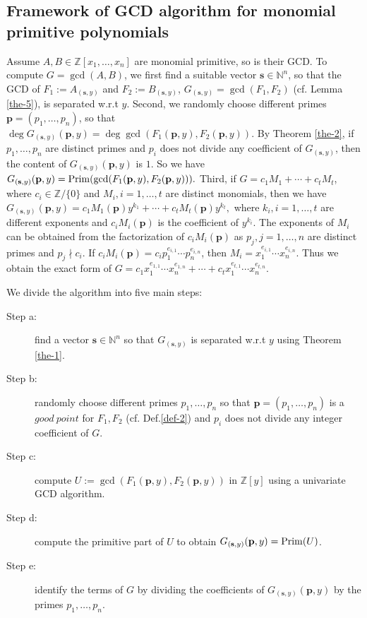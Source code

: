 \documentclass[final,20pt]{elsarticle}
\def\N{{\mathbb N}}
\def\Z{{\mathbb Z}}
\begin{document}
\subsection{Framework of GCD algorithm for monomial primitive polynomials}\label{sec-a3}
Assume $A,B\in \Z[x_1,\dots,x_n]$ are monomial primitive, so is their GCD.
%
To compute $G=\gcd(A,B)$, we first find a suitable vector $\mathbf{s}\in\N^n$, so that  the GCD of $F_1:=A_{(\mathbf{s},y)}$ and $F_2:=B_{(\mathbf{s},y)}$,  $G_{(\mathbf{s},y)}=\gcd(F_1,F_2)$ (cf. Lemma \ref{the-5}), is separated w.r.t $y$.
%
Second, we randomly choose different primes $\mathbf{p}=(p_1,\dots,p_n)$, so that $\deg G_{(\mathbf{s},y)}(\mathbf{p},y)=\deg \gcd(F_1(\mathbf{p},y),F_2(\mathbf{p},y)).$
By Theorem \ref{the-2}, if $p_1,\dots,p_n$ are distinct primes and $p_i$ does not divide any coefficient of $G_{(\mathbf{s},y)}$, then the content of $G_{(\mathbf{s},y)}(\mathbf{p},y)$ is $1$. So we have
$G_{(\mathbf{s},y)}(\mathbf{p},y)={\rm Prim}( \gcd(F_1(\mathbf{p},y),F_2(\mathbf{p},y))).$
%
Third, if $G=c_1M_1+\cdots+c_tM_t$, where $c_i\in\Z/\{0\}$ and $M_i,i=1,\dots,t$ are distinct monomials, then we have
$G_{(\mathbf{s},y)}(\mathbf{p},y)=c_1M_1(\mathbf{p})y^{k_1}+\cdots+c_tM_t(\mathbf{p})y^{k_t},$
%
where $k_i,i=1,\dots,t$ are different exponents and $c_iM_i(\mathbf{p})$ is the coefficient of $y^{k_i}$.
%
The exponents of $M_i$ can be obtained from the factorization of $c_iM_i(\mathbf{p})$ as $p_j,j=1,\dots,n$ are distinct primes and $p_j\nmid c_i$. If $c_iM_i(\mathbf{p})=c_ip_1^{e_{i,1}}\cdots p_n^{e_{i,n}}$, then $M_i=x_1^{e_{i,1}}\cdots x_n^{e_{i,n}}$.  Thus we obtain the exact form of $G=c_1x_1^{e_{1,1}}\cdots x_n^{e_{1,n}}+\cdots+c_tx_1^{e_{t,1}}\cdots x_n^{e_{t,n}}.$

We divide the algorithm into five main steps: 

\begin{description}
\item[Step a:] find a vector $\mathbf{s}\in\N^n$ so that $G_{(\mathbf{s},y)}$ is separated w.r.t $y$ using Theorem \ref{the-1}.

\item[Step b:] randomly choose different primes $p_1,\dots,p_n$ so that $\mathbf{p}=(p_1,\dots,p_n)$ is a $good\ point$ for $F_1,F_2$ (cf. Def.\ref{def-2})
and $p_i$ does not divide any integer coefficient of $G$.
\item[Step c:] compute $U:=\gcd(F_1(\mathbf{p},y),F_2(\mathbf{p},y))$  in   $\Z[y]$ using a univariate GCD algorithm.

\item[Step d:] compute the primitive part of $U$ to obtain $G_{(\mathbf{s},y)}(\mathbf{p},y)={\rm Prim}(U)$.
%
\item[Step e:] identify the terms of $G$ by dividing the coefficients of $G_{(\mathbf{s},y)}(\mathbf{p},y)$ by the primes $p_1, \dots, p_n$.
\end{description}
\end{document}
